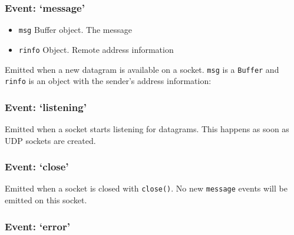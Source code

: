 \subsubsection{\texorpdfstring{Event:
`message'}{Event: message}}\label{event-message}

\begin{itemize}
\itemsep1pt\parskip0pt
\item
  \texttt{msg} Buffer object. The message
\item
  \texttt{rinfo} Object. Remote address information
\end{itemize}

Emitted when a new datagram is available on a socket. \texttt{msg} is a
\texttt{Buffer} and \texttt{rinfo} is an object with the sender's
address information:

\begin{Shaded}
\end{Shaded}

\subsubsection{\texorpdfstring{Event:
`listening'}{Event: listening}}\label{event-listening}

Emitted when a socket starts listening for datagrams. This happens as
soon as UDP sockets are created.

\subsubsection{\texorpdfstring{Event:
`close'}{Event: close}}\label{event-close}

Emitted when a socket is closed with \texttt{close()}. No new
\texttt{message} events will be emitted on this socket.

\subsubsection{\texorpdfstring{Event:
`error'}{Event: error}}\label{event-error}

